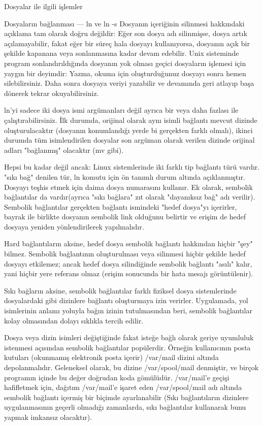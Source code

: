 \begin{section}{Dosyalar ile ilgili işlemler}
\begin{subsection}{Dosyaların bağlanması — ln ve ln -s}
Dosyanın içeriğinin silinmesi hakkındaki açıklama tam olarak doğru değildir: Eğer son dosya adı silinmişse, dosya artık açılamayabilir, fakat eğer bir süreç hala dosyayı kullanıyorsa, dosyanın açık bir şekilde kapanana veya sonlanmasına kadar devam edebilir. Unix sisteminde program sonlandırıldığında dosyanın yok olması geçici dosyaların işlemesi için yaygın bir deyimdir: Yazma, okuma için oluşturduğunuz dosyayı sonra hemen silebilirsiniz. Daha sonra dosyaya veriyi yazabilir ve devamında geri atlayıp başa dönerek tekrar okuyabilirsiniz.

ln'yi sadece iki dosya ismi argümanları değil ayrıca bir veya daha fazlası ile çalıştırabilirsiniz. İlk durumda, orijinal olarak aynı isimli bağlantı mevcut dizinde oluşturulacaktır (dosyanın konumlandığı yerde bi gerçekten farklı olmalı), ikinci durumda tüm isimlendirilen dosyalar son argüman olarak verilen dizinde orijinal adları "bağlanmış" olacaktır (mv gibi).

Hepsi bu kadar değil ancak: Linux sistemlerinde iki farklı tip bağlantı türü vardır. "sıkı bağ" denilen tür, ln komutu için ön tanımlı durum altında açıklanmıştır. Dosyayı teşhis etmek için daima dosya numarasını kullanır. Ek olarak, sembolik bağlantılar da vardır(ayrıca "sıkı bağlara" zıt olarak "dayanıksız bağ" adı verilir). Sembolik bağlantılar gerçekten  bağlantı ismindeki "hedef dosya"yı içerirler, bayrak ile birlikte dosyanın sembolik link olduğunu belirtir ve erişim de hedef dosyaya yeniden yönlendirilerek yapılmalıdır.

Hard bağlantıların aksine, hedef dosya sembolik bağlantı hakkından hiçbir "şey" bilmez. Sembolik bağlantının oluşturulması veya silinmesi hiçbir şekilde hedef dosyayı etkilemez; ancak hedef dosya silindiğinde sembolik bağlantı "asılı" kalır, yani hiçbir yere referans olmaz (erişim sonucunda bir hata mesajı görüntülenir).

Sıkı bağların aksine, sembolik bağlantılar farklı fiziksel dosya sistemlerinde dosyalardaki gibi dizinlere bağlantı oluşturmaya izin verirler. Uygulamada, yol isimlerinin anlamı yoluyla bağın izinin tutulmasından beri, sembolik bağlantılar kolay olmasından dolayı sıklıkla tercih edilir.

Dosya veya dizin isimleri değiştiğinde fakat isteğe bağlı olarak geriye uyumluluk istenmesi açısından sembolik bağlantılar popülerdir. Örneğin kullanıcının posta kutuları (okunmamış elektronik posta içerir) /var/mail dizini altında depolanmalıdır. Geleneksel olarak, bu dizine /var/spool/mail denmiştir, ve birçok programın içinde bu değer doğrudan koda gömülüdür. /var/mail'e geçişi hafifletmek için, dağıtım /var/mail'e işaret eden /var/spool/mail adı altında sembolik bağlantı içermiş bir biçimde ayarlanabilir (Sıkı bağlantıların dizinlere uygulanmasının geçerli olmadığı zamanlarda, sıkı bağlantılar kullanarak bunu yapmak imkansız olacaktır).


\end{subsection}
\end{section}
